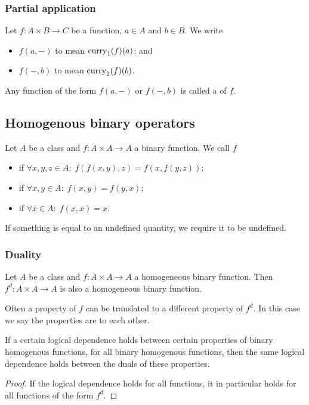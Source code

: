 \subsubsection{Partial application}
\begin{definition}
Let $f: A\times B \to C$ be a function, $a\in A$ and $b\in B$. We write
\begin{itemize}
\item $f(a, -)$ to mean $\operatorname{curry}_1(f)(a)$; and
\item $f(-, b)$ to mean $\operatorname{curry}_2(f)(b)$.
\end{itemize}
Any function of the form $f(a, -)$ or $f(-,b)$ is called a  of $f$.
\end{definition}

\subsection{Homogenous binary operators}
\begin{definition}
Let $A$ be a class and $f: A\times A \to A$ a binary function. We call $f$
\begin{itemize}
\item {} if $\forall x,y, z\in A: \; f(f(x,y),z) = f(x,f(y,z))$;
\item {} if $\forall x,y\in A: \; f(x,y) = f(y,x)$;
\item {} if $\forall x\in A:\; f(x,x) = x$.
\end{itemize}
If something is equal to an undefined quantity, we require it to be undefined.
\end{definition}

\subsubsection{Duality}
Let $A$ be a class and $f: A\times A \to A$ a homogeneous binary function. Then $f^d: A\times A \to A$ is also a homogeneous binary function.

Often a property of $f$ can be translated to a different property of $f^d$. In this case we say the properties are  to each other.

\begin{proposition}
If a certain logical dependence holds between certain properties of binary homogenous functions, for all binary homogenous functions, then the same logical dependence holds between the duals of these properties.
\end{proposition}
\begin{proof}
If the logical dependence holds for all functions, it in particular holds for all functions of the form $f^d$.
\end{proof}

